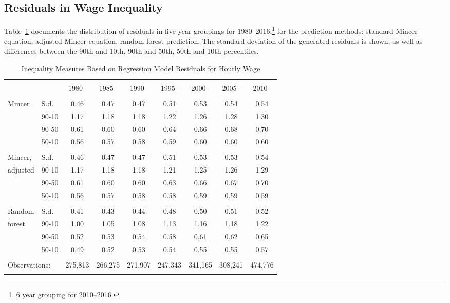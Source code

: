 \documentclass[notitlepage,12pt]{article}
\newcommand{\1}[1]{\ensuremath{\mathbb{1}\left( #1 \right)}}               %
\begin{document}
\subsection{Residuals in Wage Inequality}
Table~\ref{tab:inequalitymeasures} documents the distribution of residuals in five year groupings for 1980--2016,\footnote{6 year grouping for 2010--2016.} for the prediction methods: standard Mincer equation, adjusted Mincer equation, random forest prediction.  The standard deviation of the generated residuals is shown, as well as differences between the 90th and 10th, 90th and 50th, 50th and 10th percentiles.
\begin{table}[h]
\centering
\caption{Inequality Measures Based on Regression Model Residuals for Hourly Wage}
\label{tab:inequalitymeasures}
\begin{tabular}{@{\extracolsep{5pt}}ll|ccccccc} 
\\[-1.8ex]\hline 
\hline \\[-1.8ex] 
 & & 1980-- & 1985-- & 1990-- & 1995-- & 2000-- & 2005-- & 2010-- \\
\hline \\[-1.8ex] 
  Mincer & S.d. & 0.46 & 0.47 & 0.47 & 0.51 & 0.53 & 0.54 & 0.54 \\ 
   & 90-10 & 1.17 & 1.18 & 1.18 & 1.22 & 1.26 & 1.28 & 1.30 \\ 
   & 90-50 & 0.61 & 0.60 & 0.60 & 0.64 & 0.66 & 0.68 & 0.70 \\ 
   & 50-10 & 0.56 & 0.57 & 0.58 & 0.59 & 0.60 & 0.60 & 0.60 \\ \hline \\[-1.8ex] 
  Mincer, & S.d. & 0.46 & 0.47 & 0.47 & 0.51 & 0.53 & 0.53 & 0.54 \\
  adjusted & 90-10 & 1.17 & 1.18 & 1.18 & 1.21 & 1.25 & 1.26 & 1.29 \\ 
   & 90-50 & 0.61 & 0.60 & 0.60 & 0.63 & 0.66 & 0.67 & 0.70 \\ 
   & 50-10 & 0.56 & 0.57 & 0.58 & 0.58 & 0.59 & 0.59 & 0.59 \\ \hline \\[-1.8ex] 
  Random & S.d. & 0.41 & 0.43 & 0.44 & 0.48 & 0.50 & 0.51 & 0.52 \\ 
  forest & 90-10 & 1.00 & 1.05 & 1.08 & 1.13 & 1.16 & 1.18 & 1.22 \\ 
   & 90-50 & 0.52 & 0.53 & 0.54 & 0.58 & 0.61 & 0.62 & 0.65 \\ 
   & 50-10 & 0.49 & 0.52 & 0.53 & 0.54 & 0.55 & 0.55 & 0.57 \\ \hline \\[-1.8ex] 
  \multicolumn{2}{l}{Observations:}  & 275,813 & 266,275 & 271,907 & 247,343 & 341,165 & 308,241 & 474,776 \\ 
\hline 
\hline \\[-1.8ex] 
\end{tabular} 
\end{table}
\end{document}
